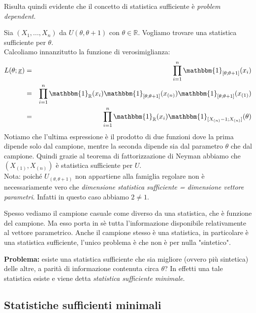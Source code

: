 Risulta quindi evidente che il concetto di statistica sufficiente è \emph{problem dependent}.
\\
\begin{esempio} Sia $(X_1,...,X_n)$ da $U(\theta, \theta +1)$ con $\theta \in \mathbb{R}$. Vogliamo trovare una statistica sufficiente per $\theta$.\\
Calcoliamo innanzitutto la funzione di verosimiglianza:
\begin{eqnarray}
L(\theta;\underline{x}) &=& \displaystyle\prod_{i=1}^n \mathbbm{1}_{[\theta; \theta +1]}(x_i)\\
&=& \displaystyle\prod_{i=1}^n \mathbbm{1}_{\mathbb{R}}(x_i) \mathbbm{1}_{[\theta; \theta +1]}(x_{(n)}) \mathbbm{1}_{[\theta; \theta +1]}(x_{(1)})\\
&=& \displaystyle\prod_{i=1}^n \mathbbm{1}_{\mathbb{R}}(x_i) \mathbbm{1}_{[X_{(n)}-1; X_{(n)}]}(\theta)
\end{eqnarray}
Notiamo che l'ultima espressione è il prodotto di due funzioni dove la prima dipende solo dal campione, mentre la seconda dipende sia dal parametro $\theta$ che dal campione. Quindi grazie al teorema di fattorizzazione di Neyman abbiamo che $(X_{(1)},X_{(n)})$ è statistica sufficiente per $U$.\\
Nota: poiché $U_{(\theta, \theta +1)}$ non appartiene alla famiglia regolare non è necessariamente vero che \emph{dimensione statistica sufficiente = dimensione vettore parametri}. Infatti in questo caso abbiamo $2 \neq 1$.
\end{esempio}

\begin{oss} Spesso vediamo il campione casuale come diverso da una statistica, che è funzione del campione. Ma esso porta in sè tutta l'informazione disponibile relativamente al vettore parametrico. Anche il campione stesso è una statistica, in particolare è una statistica sufficiente, l'unico problema è che non è per nulla "sintetico".
\end{oss}

\textbf{Problema:} esiste una statistica sufficiente che sia migliore (ovvero più sintetica) delle altre, a parità di informazione contenuta circa $\theta$? In effetti una tale statistica esiste e viene detta \textit{statistica sufficiente minimale}.


\subsection{Statistiche sufficienti minimali}

